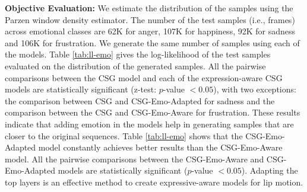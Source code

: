 \documentclass[10pt,journal,compsoc]{IEEEtran}
\begin{document}
\noindent
\textbf{Objective Evaluation:}
We estimate the distribution of the samples using the Parzen window density estimator. The number of the test samples (i.e., frames) across emotional classes are 62K for anger, 107K for happiness, 92K for sadness and 106K for frustration. We generate the same number of samples using each of the models. Table \ref{tab:ll-emo} gives the log-likelihood of the test samples evaluated on the distribution of the generated samples. All the pairwise comparisons between the CSG model and each of the expression-aware CSG models are statistically significant (z-test: $p$-value $<0.05$), with two exceptions: the comparison between CSG and CSG-Emo-Adapted for sadness and the comparison between the CSG and CSG-Emo-Aware for frustration. These results indicate that adding emotion in the models help in generating samples that are closer to the original sequences. Table \ref{tab:ll-emo} shows that the CSG-Emo-Adapted model constantly achieves better results than the CSG-Emo-Aware model. All the pairwise comparisons between the CSG-Emo-Aware and CSG-Emo-Adapted models are statistically significant ($p$-value $<0.05$). Adapting the top layers is an effective method to create expressive-aware models for lip motion. 
\end{document}
